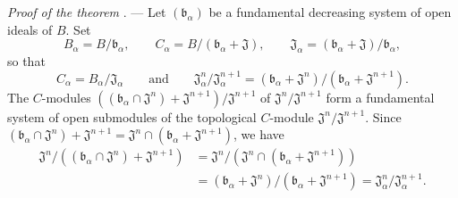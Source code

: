 \begin{env}[19.5.6]
\label{0.19.5.6}
\emph{Proof of the theorem} . ---
Let $(\mathfrak{b}_\alpha)$ be a fundamental decreasing system of open ideals of $B$.
Set
\[
  B_\alpha=B/\mathfrak{b}_\alpha,\qquad
  C_\alpha=B/(\mathfrak{b}_\alpha+\mathfrak{J}),\qquad
  \mathfrak{J}_\alpha=(\mathfrak{b}_\alpha+\mathfrak{J})/\mathfrak{b}_\alpha,
\]
so that
\[
  C_\alpha=B_\alpha/\mathfrak{J}_\alpha
  \qquad\text{and}\qquad
  \mathfrak{J}_\alpha^n/\mathfrak{J}_\alpha^{n+1}
  =(\mathfrak{b}_\alpha+\mathfrak{J}^n)/
   (\mathfrak{b}_\alpha+\mathfrak{J}^{n+1}).
\]
The $C$-modules $((\mathfrak{b}_\alpha\cap\mathfrak{J}^n)+\mathfrak{J}^{n+1})/
\mathfrak{J}^{n+1}$
of $\mathfrak{J}^n/\mathfrak{J}^{n+1}$ form a fundamental system of open submodules of the topological $C$-module $\mathfrak{J}^n/\mathfrak{J}^{n+1}$.
Since $(\mathfrak{b}_\alpha\cap\mathfrak{J}^n)+\mathfrak{J}^{n+1}
=\mathfrak{J}^n\cap(\mathfrak{b}_\alpha+\mathfrak{J}^{n+1})$,
we have
\[
\begin{aligned}
  \mathfrak{J}^n/((\mathfrak{b}_\alpha\cap\mathfrak{J}^n)+\mathfrak{J}^{n+1})
  &=
  \mathfrak{J}^n/(\mathfrak{J}^n\cap(\mathfrak{b}_\alpha+\mathfrak{J}^{n+1}))\\
  &=
  (\mathfrak{b}_\alpha+\mathfrak{J}^n)/
  (\mathfrak{b}_\alpha+\mathfrak{J}^{n+1})
  =\mathfrak{J}_\alpha^n/\mathfrak{J}_\alpha^{n+1}.
\end{aligned}
\]
\end{env}

